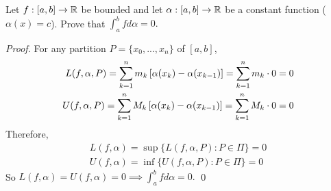 \begin{example}
    Let $f:[a,b] \to \mathbb{R}$ be bounded and let $\alpha : [a,b] \to \mathbb{R}$ be a constant function ($\alpha (x) = c$). Prove that $\int_{a}^{b}f d\alpha = 0.$
\end{example}
\begin{proof}
    For any partition $P= \{x_0, ..., x_n\}$ of $[a,b]$,
    \begin{align*}
        L(f, \alpha, P) = \sum_{k=1}^{n}m_k \left[\alpha(x_{k})-\alpha(x_{k-1})\right] = \sum_{k=1}^{n}m_k \cdot 0 =0 \\ 
        U(f, \alpha, P) = \sum_{k=1}^{n}M_k \left[\alpha(x_{k})-\alpha(x_{k-1})\right] = \sum_{k=1}^{n}M_k \cdot 0=0
    \end{align*}
    Therefore,
    \begin{align*}
        L(f, \alpha) = \sup \{L(f, \alpha, P) : P \in \Pi\} = 0 \\
        U(f, \alpha) = \inf \{U(f, \alpha, P) : P \in \Pi\} = 0
    \end{align*}
    So $L(f, \alpha) = U(f, \alpha) = 0 \implies \int_{a}^{b}f d\alpha = 0.$
    \qed
\end{proof}


